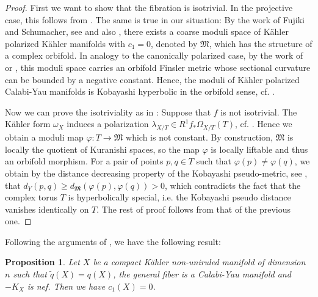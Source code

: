 \documentclass[a4, 12pt]{amsart}
\newtheorem{prop}[thm]{Proposition}
\numberwithin{equation}{section}
\theoremstyle{definition}
\begin{document}
\begin{proof}
First we want to show that the fibration is isotrivial. In the projective case, this follows from \cite[Theorem A]{Den19}. The same is true in our situation:  By the work of Fujiki and Schumacher, see \cite[Thm. 5.4]{FS90} and also \cite{Sch83, Fu84}, there exists a coarse moduli space of K\"ahler polarized K\"ahler manifolds with $c_1=0$, denoted by $\mathfrak{M}$, which has the structure of a complex orbifold. In analogy to the canonically polarized case, by the work of \cite{Bra15} or \cite{TY18}, this moduli space carries an orbifold Finsler metric  whose sectional curvature can be bounded by a negative constant. Hence, the moduli of K\"ahler polarized Calabi-Yau manifolds is Kobayashi hyperbolic in the orbifold sense, cf. \cite[Thm. C]{Den19}.  

Now we can prove the isotriviality as in \cite[pf. of Thm. C]{Den19}: Suppose that $f$ is not isotrivial. The K\"ahler form $\omega_X$ induces a polarization $\lambda_{X/T} \in R^1f_*\Omega_{X/T}(T)$, cf. \cite{FS90}. Hence we obtain a moduli map $\varphi: T \to \mathfrak{M}$ which is not constant. By construction, 
$\mathfrak{M}$ is locally the quotient of Kuranishi spaces, so the map $\varphi$ is locally liftable and thus an orbifold morphism. For a pair of points $p,q \in T$ such that $\varphi(p) \neq \varphi(q)$, we obtain by the distance decreasing property of the Kobayashi pseudo-metric, see \cite[Lemma 3.4]{Den19}, that $d_Y(p,q) \geq d_{\mathfrak{M}}(\varphi(p), \varphi(q))>0$, which contradicts the fact that the complex torus $T$ is hyperbolically special, i.e. the Kobayashi pseudo distance vanishes identically on $T$. The rest of proof follows from that of the previous one.
\end{proof}
Following the arguments of \cite[Theorem 3.1]{TZ14}, we have the following result:
\begin{prop} \label{Prop3}
Let $X$ be a compact K\"ahler non-uniruled manifold of dimension $n$ such that 
$\tilde{q}(X)=q(X)$, the general fiber is a Calabi-Yau manifold and 
$-K_X$ is nef.
Then we have $c_1(X)=0$.
\end{prop}
\end{document}
